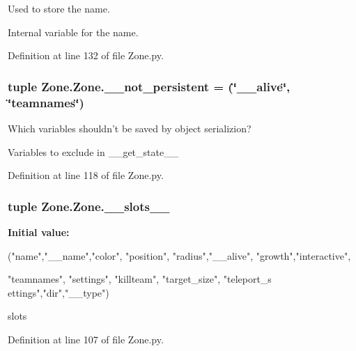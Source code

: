 Used to store the name. 

Internal variable for the name. 

Definition at line 132 of file Zone.py.

\hypertarget{class_zone_1_1_zone_a3e925f38205ecb6e4c2bab8c79182573}{
\subsubsection[{\_\-\_\-not\_\-persistent}]{\setlength{\rightskip}{0pt plus 5cm}tuple {\bf Zone.Zone.\_\-\_\-not\_\-persistent} = (\char`\"{}\_\-\_\-alive\char`\"{}, \char`\"{}{\bf teamnames}\char`\"{})}}
\label{class_zone_1_1_zone_a3e925f38205ecb6e4c2bab8c79182573}


Which variables shouldn't be saved by object serializion? 

Variables to exclude in \_\-\_\-get\_\-state\_\-\_\- 

Definition at line 118 of file Zone.py.

\hypertarget{class_zone_1_1_zone_ad5bde96ea6dea6f68ee68d33a6c90850}{
\subsubsection[{\_\-\_\-slots\_\-\_\-}]{\setlength{\rightskip}{0pt plus 5cm}tuple {\bf Zone.Zone.\_\-\_\-slots\_\-\_\-}}}
\label{class_zone_1_1_zone_ad5bde96ea6dea6f68ee68d33a6c90850}
{\bfseries Initial value:}
\begin{DoxyCode}
("name","__name","color", "position", "radius","__alive", "growth","interactive",
       
                  "teamnames", "settings", "killteam", "target_size", "teleport_s
      ettings","dir","__type")
\end{DoxyCode}


slots 



Definition at line 107 of file Zone.py.

\hypertarget{class_zone_1_1_zone_a5164f57edacb2b3a7b3dfca3ba949139}{
\subsubsection[{\_\-\_\-type}]{}}
\label{class_zone_1_1_zone_a5164f57edacb2b3a7b3dfca3ba949139}



